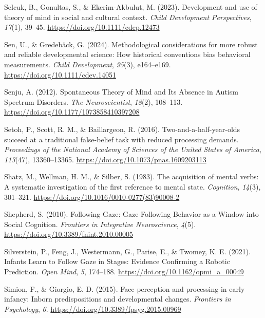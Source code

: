 \documentclass[
]{scrbook}
\newlength{\cslhangindent}
\newenvironment{CSLReferences}[2] %
 {\begin{list}{}{%
  \setlength{\itemindent}{0pt}
  \setlength{\leftmargin}{0pt}
  \setlength{\parsep}{0pt}
  \ifodd #1
   \setlength{\leftmargin}{\cslhangindent}
   \setlength{\itemindent}{-1\cslhangindent}
  \fi
  \setlength{\itemsep}{#2\baselineskip}}}
 {\end{list}}
\begin{document}
\begin{CSLReferences}{1}{0}
Selcuk, B., Gonultas, S., \& Ekerim-Akbulut, M. (2023). Development and use of theory of mind in social and cultural context. \emph{Child Development Perspectives}, \emph{17}(1), 39--45. \url{https://doi.org/10.1111/cdep.12473}

Sen, U., \& Gredebäck, G. (2024). Methodological considerations for more robust and reliable developmental science: {How} historical conventions bias behavioral measurements. \emph{Child Development}, \emph{95}(3), e164--e169. \url{https://doi.org/10.1111/cdev.14051}

Senju, A. (2012). Spontaneous {Theory} of {Mind} and {Its Absence} in {Autism Spectrum Disorders}. \emph{The Neuroscientist}, \emph{18}(2), 108--113. \url{https://doi.org/10.1177/1073858410397208}

Setoh, P., Scott, R. M., \& Baillargeon, R. (2016). Two-and-a-half-year-olds succeed at a traditional false-belief task with reduced processing demands. \emph{Proceedings of the National Academy of Sciences of the United States of America}, \emph{113}(47), 13360--13365. \url{https://doi.org/10.1073/pnas.1609203113}

Shatz, M., Wellman, H. M., \& Silber, S. (1983). The acquisition of mental verbs: {A} systematic investigation of the first reference to mental state. \emph{Cognition}, \emph{14}(3), 301--321. \url{https://doi.org/10.1016/0010-0277(83)90008-2}

Shepherd, S. (2010). Following {Gaze}: {Gaze-Following Behavior} as a {Window} into {Social Cognition}. \emph{Frontiers in Integrative Neuroscience}, \emph{4}(5). \url{https://doi.org/10.3389/fnint.2010.00005}

Silverstein, P., Feng, J., Westermann, G., Parise, E., \& Twomey, K. E. (2021). Infants {Learn} to {Follow Gaze} in {Stages}: {Evidence Confirming} a {Robotic Prediction}. \emph{Open Mind}, \emph{5}, 174--188. \url{https://doi.org/10.1162/opmi_a_00049}

Simion, F., \& Giorgio, E. D. (2015). Face perception and processing in early infancy: Inborn predispositions and developmental changes. \emph{Frontiers in Psychology}, \emph{6}. \url{https://doi.org/10.3389/fpsyg.2015.00969}


\end{CSLReferences}
\end{document}
